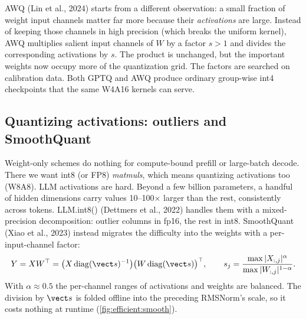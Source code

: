 AWQ (Lin et al., 2024) starts from a different observation: a small fraction of weight
input channels matter far more because their \emph{activations} are large. Instead of
keeping those channels in high precision (which breaks the uniform kernel), AWQ
multiplies salient input channels of $W$ by a factor $s>1$ and divides the
corresponding activations by $s$. The product is unchanged, but the important weights
now occupy more of the quantization grid. The factors are searched on calibration data.
Both GPTQ and AWQ produce ordinary group-wise int4 checkpoints that the same W4A16
kernels can serve.

\subsection{Quantizing activations: outliers and SmoothQuant}
Weight-only schemes do nothing for compute-bound prefill or large-batch decode. There
we want int8 (or FP8) \emph{matmuls}, which means quantizing activations too (W8A8).
LLM activations are hard. Beyond a few billion parameters, a handful of hidden
dimensions carry values 10--100$\times$ larger than the rest, consistently across
tokens. LLM.int8() (Dettmers et al., 2022) handles them with a mixed-precision
decomposition: outlier columns in fp16, the rest in int8. SmoothQuant (Xiao et al.,
2023) instead migrates the difficulty into the weights with a per-input-channel factor:
\begin{equation}
  Y = X W^\top = \big(X\,\mathrm{diag}(\vect s)^{-1}\big)\big(W\,\mathrm{diag}(\vect s)\big)^\top,
  \qquad s_j = \frac{\max|X_{:,j}|^{\alpha}}{\max|W_{:,j}|^{1-\alpha}} .
  \label{eq:efficient:smooth}
\end{equation}
With $\alpha\approx0.5$ the per-channel ranges of activations and weights are balanced.
The division by $\vect s$ is folded offline into the preceding RMSNorm's scale, so it
costs nothing at runtime (\cref{fig:efficient:smooth}).


